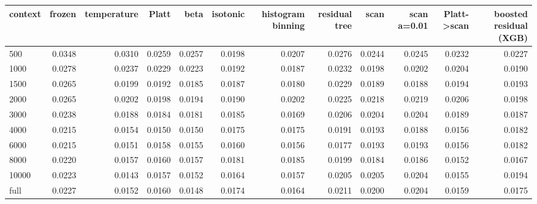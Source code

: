 \begin{tabular}{lrrrrrrrrrrr}
\toprule
context & frozen & temperature & Platt & beta & isotonic & histogram binning & residual tree & scan & scan a=0.01 & Platt->scan & boosted residual (XGB) \\
\midrule
500 & 0.0348 & 0.0310 & 0.0259 & 0.0257 & 0.0198 & 0.0207 & 0.0276 & 0.0244 & 0.0245 & 0.0232 & 0.0227 \\
1000 & 0.0278 & 0.0237 & 0.0229 & 0.0223 & 0.0192 & 0.0187 & 0.0232 & 0.0198 & 0.0202 & 0.0204 & 0.0190 \\
1500 & 0.0265 & 0.0199 & 0.0192 & 0.0185 & 0.0187 & 0.0180 & 0.0229 & 0.0189 & 0.0188 & 0.0194 & 0.0193 \\
2000 & 0.0265 & 0.0202 & 0.0198 & 0.0194 & 0.0190 & 0.0202 & 0.0225 & 0.0218 & 0.0219 & 0.0206 & 0.0198 \\
3000 & 0.0238 & 0.0188 & 0.0184 & 0.0181 & 0.0185 & 0.0169 & 0.0206 & 0.0204 & 0.0204 & 0.0189 & 0.0187 \\
4000 & 0.0215 & 0.0154 & 0.0150 & 0.0150 & 0.0175 & 0.0175 & 0.0191 & 0.0193 & 0.0188 & 0.0156 & 0.0182 \\
6000 & 0.0215 & 0.0151 & 0.0158 & 0.0155 & 0.0160 & 0.0156 & 0.0177 & 0.0193 & 0.0193 & 0.0156 & 0.0182 \\
8000 & 0.0220 & 0.0157 & 0.0160 & 0.0157 & 0.0181 & 0.0185 & 0.0199 & 0.0184 & 0.0186 & 0.0152 & 0.0167 \\
10000 & 0.0223 & 0.0143 & 0.0157 & 0.0152 & 0.0164 & 0.0157 & 0.0205 & 0.0205 & 0.0204 & 0.0155 & 0.0194 \\
full & 0.0227 & 0.0152 & 0.0160 & 0.0148 & 0.0174 & 0.0164 & 0.0211 & 0.0200 & 0.0204 & 0.0159 & 0.0175 \\
\bottomrule
\end{tabular}
